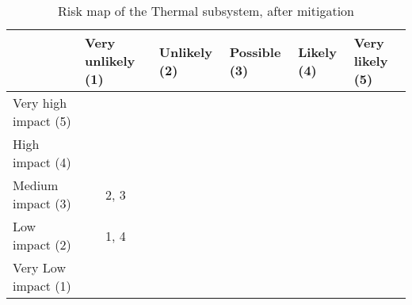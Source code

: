\begin{table}[H]
\centering
\caption{Risk map of the Thermal subsystem, after mitigation}
\label{tab:risk-map-thermal-mitig}\begin{tabular}{l|c|c|c|c|c|}
\cline{2-6}
& \multicolumn{1}{l|}{Very unlikely (1)} & \multicolumn{1}{l|}{Unlikely (2)} & \multicolumn{1}{l|}{Possible (3)} & \multicolumn{1}{l|}{Likely (4)} & \multicolumn{1}{l|}{Very likely (5)} \\ \hline
\multicolumn{1}{|l|}{Very high impact (5)} & \cellcolor{rm-3} & \cellcolor{rm-3} & \cellcolor{rm-3} & \cellcolor{rm-3} & \cellcolor{rm-3}\\ \hline 
\multicolumn{1}{|l|}{High impact (4)} & \cellcolor{rm-2} & \cellcolor{rm-2} & \cellcolor{rm-2} & \cellcolor{rm-3} & \cellcolor{rm-3}\\ \hline 
\multicolumn{1}{|l|}{Medium impact (3)} & \cellcolor{rm-0}2, 3 & \cellcolor{rm-1} & \cellcolor{rm-1} & \cellcolor{rm-2} & \cellcolor{rm-3}\\ \hline 
\multicolumn{1}{|l|}{Low impact (2)} & \cellcolor{rm-0}1, 4 & \cellcolor{rm-0} & \cellcolor{rm-1} & \cellcolor{rm-2} & \cellcolor{rm-3}\\ \hline 
\multicolumn{1}{|l|}{Very Low impact (1)} & \cellcolor{rm-0} & \cellcolor{rm-0} & \cellcolor{rm-0} & \cellcolor{rm-2} & \cellcolor{rm-3}\\ \hline 
\end{tabular} 
\end{table}

